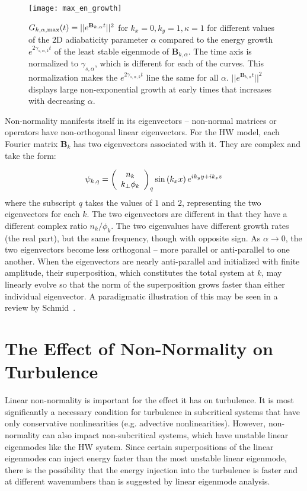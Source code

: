 \documentclass[twocolumn,showkeys,superscriptaddress]{revtex4}
\def\beq{\begin{equation}}
\def\eeq{\end{equation}}
\begin{document}
\begin{figure}
\centerline{\texttt{[image: max\_en\_growth]}}
\caption{$G_{k,\alpha,\rm{max}}(t) = ||e^{\mathbf{B}_{k,\alpha} t}||^2$ for $k_x=0, k_y=1, \kappa=1$ for different values of the 2D adiabaticity parameter 
$\alpha$ compared to the energy growth $e^{2 \gamma_{s,\alpha,k} t}$ of the least stable eigenmode of  $\mathbf{B}_{k,\alpha}$. 
The time axis is normalized to $\gamma_{s,\alpha}$, which is different for each of the curves. This normalization makes the $e^{2 \gamma_{s,\alpha,k} t}$ line the same for all $\alpha$. 
$||e^{\mathbf{B}_{k,\alpha} t}||^2$ displays large non-exponential growth at early times that increases with decreasing $\alpha$.}
\label{max_en_growth}
\end{figure}

Non-normality manifests itself in its eigenvectors -- non-normal matrices or operators have non-orthogonal linear eigenvectors. For the HW model, each Fourier matrix $\mathbf{B}_k$ has two eigenvectors associated
with it. They are complex and take the form:

\beq
\label{lin_eigen_form}
\psi_{k,q} = \left( \begin{array}{cc} n_k \\ k_\perp \phi_k \end{array} \right)_q {\rm sin} \left( k_x x \right) e^{i k_y y + i k_z z} 
\eeq
where the subscript $q$ takes the values of $1$ and $2$, representing the two eigenvectors for each $k$. The two eigenvectors are different in that they have a different complex ratio $n_k/\phi_k$.
The two eigenvalues have different growth rates (the real part), but the same frequency, though with opposite sign.
As $\alpha \to 0$, the two eigenvectors become less orthogonal -- more parallel or anti-parallel to one another. When the eigenvectors are nearly anti-parallel and initialized with finite amplitude,
their superposition, which constitutes the total system at $k$, may linearly evolve so that the norm of the superposition grows faster than either individual eigenvector. A paradigmatic illustration
of this may be seen in a review by Schmid~\cite{schmid2007}.

\section{The Effect of Non-Normality on Turbulence}
\label{sec_non_norm_turb}

Linear non-normality is important for the effect it has on turbulence. It is most significantly a necessary condition for turbulence in subcritical systems that have only conservative nonlinearities 
(e.g. advective nonlinearities). However, non-normality can also impact non-subcritical systems, which have unstable linear eigenmodes like the HW system. 
Since certain superpositions of the linear eigenmodes can inject energy faster than the most unstable linear
eigenmode, there is the possibility that the energy injection into the turbulence is faster and at different wavenumbers than is suggested by linear eigenmode analysis. 
\end{document}
